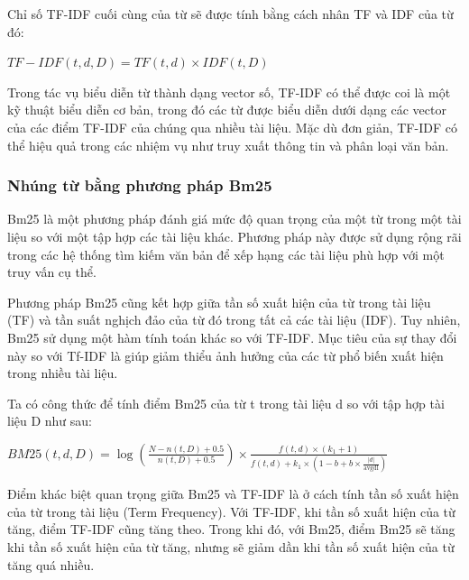 \documentclass[a4paper, 12pt, openany]{book}
\begin{document}
Chỉ số TF-IDF cuối cùng của từ sẽ được tính bằng cách nhân TF và IDF của từ đó:

\begin{center}
    \(TF-IDF(t, d, D) = TF(t, d) \times IDF(t, D)\)
\end{center}

Trong tác vụ biểu diễn từ thành dạng vector số, TF-IDF có thể được coi là một kỹ thuật biểu diễn cơ bản, trong đó các từ được biểu diễn dưới dạng các vector của các điểm TF-IDF của chúng qua nhiều tài liệu. Mặc dù đơn giản, TF-IDF có thể hiệu quả trong các nhiệm vụ như truy xuất thông tin và phân loại văn bản.

\subsubsection{Nhúng từ bằng phương pháp Bm25}

Bm25 là một phương pháp đánh giá mức độ quan trọng của một từ trong một tài liệu so với một tập hợp các tài liệu khác. Phương pháp này được sử dụng rộng rãi trong các hệ thống tìm kiếm văn bản để xếp hạng các tài liệu phù hợp với một truy vấn cụ thể.

Phương pháp Bm25 cũng kết hợp giữa tần số xuất hiện của từ trong tài liệu (TF) và tần suất nghịch đảo của từ đó trong tất cả các tài liệu (IDF). Tuy nhiên, Bm25 sử dụng một hàm tính toán khác so với TF-IDF.
Mục tiêu của sự thay đổi này so với Tf-IDF là giúp giảm thiểu ảnh hưởng của các từ phổ biến xuất hiện trong nhiều tài liệu.

Ta có công thức để tính điểm Bm25 của từ t trong tài liệu d so với tập hợp tài liệu D như sau:

\begin{center}
    \(BM25(t, d, D) = \log \left( \frac{N - n(t, D) + 0.5}{n(t, D) + 0.5} \right) \times \frac{f(t, d) \times (k_1 + 1)}{f(t, d) + k_1 \times (1 - b + b \times \frac{|d|}{\text{avgdl}})}\)
\end{center}

Điểm khác biệt quan trọng giữa Bm25 và TF-IDF là ở cách tính tần số xuất hiện của từ trong tài liệu (Term Frequency).
Với TF-IDF, khi tần số xuất hiện của từ tăng, điểm TF-IDF cũng tăng theo. Trong khi đó, với Bm25, điểm Bm25 sẽ tăng khi tần số xuất hiện của từ tăng, nhưng sẽ giảm dần khi tần số xuất hiện của từ tăng quá nhiều.
\end{document}
